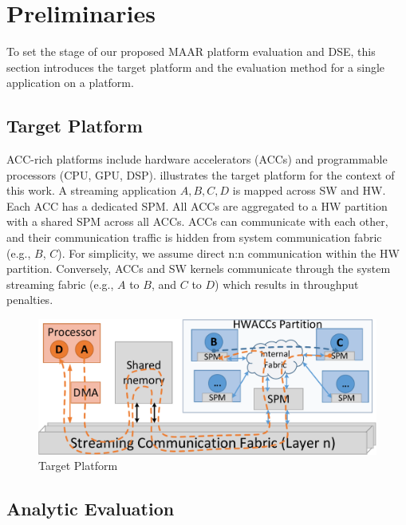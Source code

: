 \vspace{-2pt}
\section{Preliminaries}
\label{sec:pre}

To set the stage of our proposed MAAR platform evaluation and DSE, this section introduces the target platform and the evaluation method for a single application on a platform.


\subsection{Target Platform}

ACC-rich platforms include hardware accelerators (ACCs) and programmable processors (CPU, GPU, DSP).  illustrates the target platform for the context of this work. A streaming application $A, B, C, D$ is mapped across SW and HW. Each ACC has a dedicated SPM. All ACCs are aggregated to a HW partition with a shared SPM across all ACCs. ACCs can communicate with each other, and their communication traffic is hidden from system communication fabric (e.g., $B$, $C$). For simplicity, we assume direct n:n communication within the HW partition. Conversely, ACCs and SW kernels communicate through the system streaming fabric (e.g., $A$ to $B$, and $C$ to $D$) which results in throughput penalties.

\vspace{-2pt}
\begin{figure}[h]
	\centering
	\includegraphics[width=.65\linewidth]{fig/pPlat.pdf}
	\vspace{-4pt}
	\caption{Target Platform}
	\label{fig:plat}
\end{figure}


\vspace{-2pt}
\subsection{Analytic Evaluation}
\label{subsec:ana}

